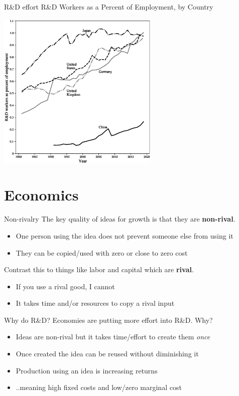 \begin{frame}{R\&D effort}
R\&D Workers as a Percent of Employment, by Country
\begin{center}
\includegraphics[height = 3in]{../Figures/fig-ch4-fig3.eps}
\end{center}
\end{frame}

\section{Economics}

\begin{frame}{Non-rivalry}
The key quality of ideas for growth is that they are \textbf{non-rival}.
\begin{itemize}
	\item One person using the idea does not prevent someone else from using it
	\item They can be copied/used with zero or close to zero cost
\end{itemize}
Contrast this to things like labor and capital which are \textbf{rival}.
\begin{itemize}
	\item If you use a rival good, I cannot
	\item It takes time and/or resources to copy a rival input
\end{itemize}
\end{frame}

\begin{frame}{Why do R\&D?}
Economies are putting more effort into R\&D. Why?
\begin{itemize}
	\item Ideas are non-rival but it takes time/effort to create them \textit{once}
	\item Once created the idea can be reused without diminishing it
	\item Production using an idea is increasing returns
	\item ..meaning high fixed costs and low/zero marginal cost
\end{itemize}
\end{frame}

